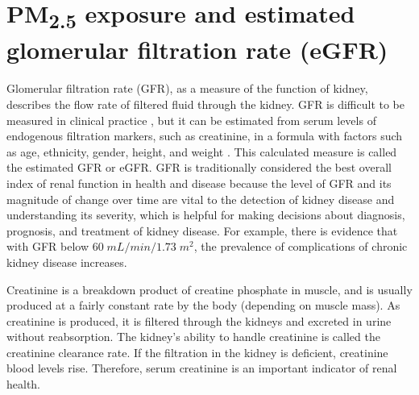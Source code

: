 \documentclass[11pt]{article}
\newcommand{\tsub}{\textsubscript}
\begin{document}
\section{\texorpdfstring{PM\tsub{2.5}}{PM2.5} exposure and estimated glomerular filtration rate (eGFR)}
\begin{enumerate*}[{[a)]}]
    \item Glomerular filtration rate (GFR), as a measure of the function of kidney, describes the flow rate of filtered fluid through the kidney. GFR is difficult to be measured in clinical practice \citep{stevens2009measured}, but it can be estimated from serum levels of endogenous filtration markers, such as creatinine, in a formula with factors such as age, ethnicity, gender, height, and weight \citep{levey1999more}. This calculated measure is called the estimated GFR or eGFR. GFR is traditionally considered the best overall index of renal function in health and disease \citep{smith1951diseases} because the level of GFR and its magnitude of change over time are vital to the detection of kidney disease and understanding its severity, which is helpful for making decisions about diagnosis, prognosis, and treatment of kidney disease. For example, there is evidence \citep{zhang2012prevalence} that with GFR below $60\;mL/min/1.73\;m^2$, the prevalence of complications of chronic kidney disease increases. 
    
    \item Creatinine is a breakdown product of creatine phosphate in muscle, and is usually produced at a fairly constant rate by the body (depending on muscle mass). As creatinine is produced, it is filtered through the kidneys and excreted in urine without reabsorption. The kidney's ability to handle creatinine is called the creatinine clearance rate. If the filtration in the kidney is deficient, creatinine blood levels rise. Therefore, serum creatinine is an important indicator of renal health. 
    

\end{enumerate*}
\end{document}
